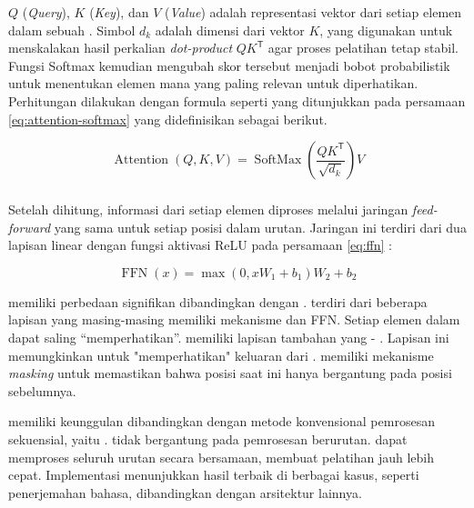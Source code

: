 $Q$ (\emph{Query}), $K$ (\emph{Key}), dan $V$ (\emph{Value}) adalah representasi vektor dari setiap elemen dalam sebuah \sequence. Simbol $d_k$ adalah dimensi dari vektor $K$, yang digunakan untuk menskalakan hasil perkalian \emph{dot-product} $QK^\mathsf{T}$ agar proses pelatihan tetap stabil. Fungsi Softmax kemudian mengubah skor tersebut menjadi bobot probabilistik untuk menentukan elemen mana yang paling relevan untuk diperhatikan.
\newpage
Perhitungan \attention{} dilakukan dengan formula seperti yang ditunjukkan pada persamaan \eqref{eq:attention-softmax} \parencite{vaswani2017attention} yang didefinisikan sebagai berikut.

\begin{equation}
	\label{eq:attention-softmax}
		\operatorname{Attention}(Q, K, V) = \operatorname{SoftMax}\left(\frac{QK^\mathsf{T}}{\sqrt{d_k}}\right)V
\end{equation}

\subsubsection{\ffnfull}
Setelah \attention{} dihitung, informasi dari setiap elemen diproses melalui jaringan \emph{feed-forward} yang sama untuk setiap posisi dalam urutan. Jaringan ini terdiri dari dua lapisan linear dengan fungsi aktivasi ReLU pada persamaan \eqref{eq:ffn} \parencite{vaswani2017attention}:

\begin{equation}
	\label{eq:ffn}
	\operatorname{FFN}(x) = \max(0, xW_1 + b_1)W_2 + b_2
\end{equation}

\decoderfl{} memiliki perbedaan signifikan dibandingkan dengan \encoder. \encoderfl{} terdiri dari beberapa lapisan yang masing-masing memiliki mekanisme \selfattention{} dan FFN. Setiap elemen dalam \sequence{} dapat saling “memperhatikan”. \decoderfl{} memiliki lapisan tambahan yang \encoder{}\--\decoder{} \attention. Lapisan ini memungkinkan \decoder{} untuk "memperhatikan" keluaran dari \encoder. \decoderfl{} memiliki mekanisme \emph{masking} untuk memastikan bahwa posisi saat ini hanya bergantung pada posisi sebelumnya.

\transformer{} memiliki keunggulan dibandingkan dengan metode konvensional pemrosesan sekuensial, yaitu \rnn. \transformer{} tidak bergantung pada pemrosesan berurutan. \transformer{} dapat memproses seluruh urutan secara bersamaan, membuat pelatihan jauh lebih cepat. Implementasi \transformer{} menunjukkan hasil terbaik di berbagai kasus, seperti penerjemahan bahasa, dibandingkan dengan arsitektur lainnya.
